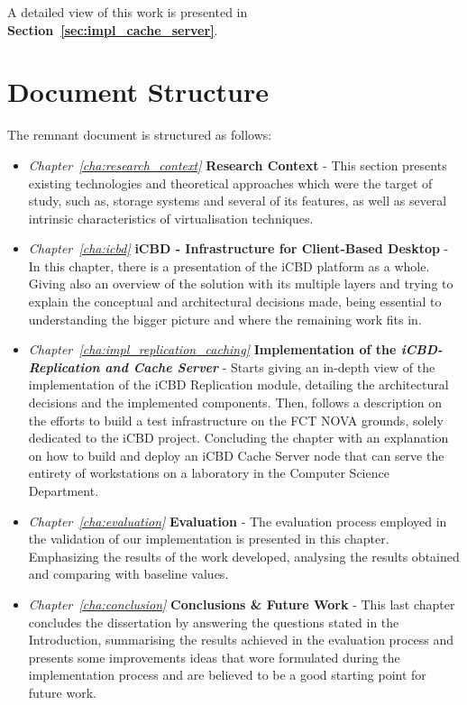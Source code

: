 A detailed view of this work is presented in \textbf{Section~\ref{sec:impl_cache_server}}.



\section{Document Structure} %
\label{sec:document_structure}

The remnant document is structured as follows: 

\begin{itemize}

  \item \textit{Chapter~\ref{cha:research_context}}  \textbf{Research Context} - This section presents existing technologies and theoretical approaches which were the target of study, such as, storage systems and several of its features, as well as several intrinsic characteristics of virtualisation techniques.
  \item \textit{Chapter~\ref{cha:icbd}} \textbf{iCBD - Infrastructure for Client-Based Desktop} - In this chapter, there is a presentation of the iCBD platform as a whole. Giving also an overview of the solution with its multiple layers and trying to explain the conceptual and architectural decisions made, being essential to understanding the bigger picture and where the remaining work fits in.
  \item \textit{Chapter~\ref{cha:impl_replication_caching}} \textbf{Implementation of the \textit{iCBD-Replication and Cache Server}} - Starts giving an in-depth view of the implementation of the iCBD Replication module, detailing the architectural decisions and the implemented components. Then, follows a description on the efforts to build a test infrastructure on the FCT NOVA grounds, solely dedicated to the iCBD project. Concluding the chapter with an explanation on how to build and deploy an iCBD Cache Server node that can serve the entirety of workstations on a laboratory in the Computer Science Department.
  \item \textit{Chapter~\ref{cha:evaluation}} \textbf{Evaluation} - The evaluation process employed in the validation of our implementation is presented in this chapter. Emphasizing the results of the work developed, analysing the results obtained and comparing with baseline values.
  \item \textit{Chapter~\ref{cha:conclusion}} \textbf{Conclusions \& Future Work} - This last chapter concludes the dissertation by answering the questions stated in the Introduction, summarising the results achieved in the evaluation process and presents some improvements ideas that wore formulated during the implementation process and are believed to be a good starting point for future work.
\end{itemize}

